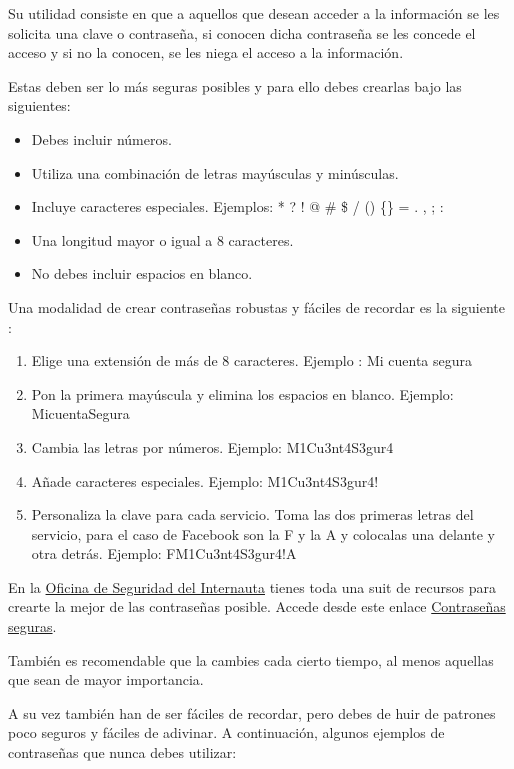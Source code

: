 \documentclass[
  spanish,
  a4paper,
  openany]{book}
\begin{document}
Su utilidad consiste en que a aquellos que desean acceder a la información se les solicita una clave o contraseña, si conocen dicha contraseña se les concede el acceso y si no la conocen, se les niega el acceso a la información.

Estas deben ser lo más seguras posibles y para ello debes crearlas bajo las siguientes:

\begin{itemize}
\item
  Debes incluir números.
\item
  Utiliza una combinación de letras mayúsculas y minúsculas.
\item
  Incluye caracteres especiales. Ejemplos: * ? ! @ \# \$ / () \{\} = . , ; :
\item
  Una longitud mayor o igual a 8 caracteres.
\item
  No debes incluir espacios en blanco.
\end{itemize}

Una modalidad de crear contraseñas robustas y fáciles de recordar es la siguiente \citep{OSI-contraseñas}:

\begin{enumerate}
\def\labelenumi{\arabic{enumi}.}
\item
  Elige una extensión de más de 8 caracteres. Ejemplo : Mi cuenta segura
\item
  Pon la primera mayúscula y elimina los espacios en blanco. Ejemplo: MicuentaSegura
\item
  Cambia las letras por números. Ejemplo: M1Cu3nt4S3gur4
\item
  Añade caracteres especiales. Ejemplo: M1Cu3nt4S3gur4!
\item
  Personaliza la clave para cada servicio. Toma las dos primeras letras del servicio, para el caso de Facebook son la F y la A y colocalas una delante y otra detrás. Ejemplo: FM1Cu3nt4S3gur4!A
\end{enumerate}

En la \href{https://www.osi.es/es}{Oficina de Seguridad del Internauta} tienes toda una suit de recursos para crearte la mejor de las contraseñas posible. Accede desde este enlace \href{https://www.osi.es/es/campanas/contrasenas-seguras}{Contraseñas seguras}.

También es recomendable que la cambies cada cierto tiempo, al menos aquellas que sean de mayor importancia.

A su vez también han de ser fáciles de recordar, pero debes de huir de patrones poco seguros y fáciles de adivinar. A continuación, algunos ejemplos de contraseñas que nunca debes utilizar:
\end{document}
